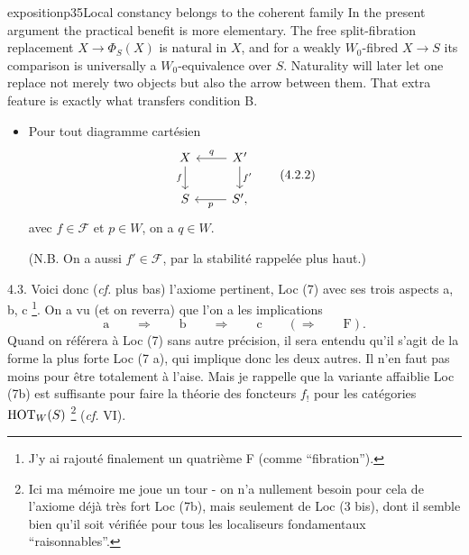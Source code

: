 \begin{dcomment}{exposition}{p35}{Local constancy belongs to the coherent family}
In the present argument the practical benefit is more elementary. The free split-fibration replacement $X\to\Phi_S(X)$ is natural in $X$, and for a weakly $W_0$-fibred $X\to S$ its comparison is universally a $W_0$-equivalence over $S$. Naturality will later let one replace not merely two objects but also the arrow between them. That extra feature is exactly what transfers condition B.
\end{dcomment}


\begin{itemize}[label={},leftmargin=3.5cm]
\item Pour tout diagramme cartésien
\[
\begin{tikzcd}
X \arrow[d, "f"'] & X' \arrow[l, "q"'] \arrow[d, "f'"] \\
S & S', \arrow[l, "p"]
\end{tikzcd}
\tag*{(4.2.2)}
\]
avec $f \in \mathcal{F}$ et $p \in W$, on a $q \in W$.

(N.B. On a aussi $f' \in \mathcal{F}$, par la stabilité rappelée plus haut.)
\end{itemize}

4.3. Voici donc (\textit{cf.} plus bas) l'axiome pertinent, Loc (7) avec ses trois aspects a, b, c \footnote[23]{J'y ai rajouté finalement un quatrième F (comme “fibration”).}. On a vu (et on reverra) que l'on a les implications
\[
\text{a} \qquad \Longrightarrow \qquad \text{b} \qquad \Longrightarrow \qquad \text{c} \qquad (\Longrightarrow \qquad \text{F}).
\]
Quand on référera à Loc (7) sans autre précision, il sera entendu qu'il s'agit de la forme la plus forte Loc (7 a), qui implique donc les deux autres. Il n'en faut pas moins pour être totalement à l'aise. Mais je rappelle que la variante affaiblie Loc (7b) est suffisante pour faire la théorie des foncteurs $f_!$ pour les catégories $\mathrm{HOT}_W(S)$ \footnote[24]{Ici ma mémoire me joue un tour - on n'a nullement besoin pour cela de l'axiome déjà très fort Loc (7b), mais seulement de Loc (3 bis), dont il semble bien qu'il soit vérifiée pour tous les localiseurs fondamentaux “raisonnables”. %
} (\textit{cf.} VI).


